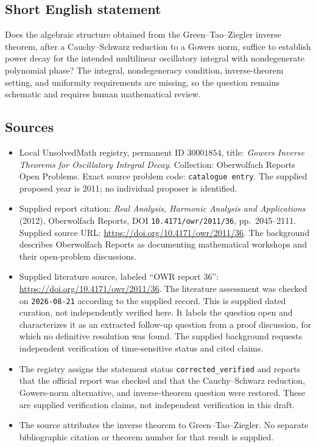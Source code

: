 \documentclass[11pt]{article}
\begin{document}
\subsection{Short English statement}
Does the algebraic structure obtained from the Green--Tao--Ziegler inverse theorem, after a Cauchy--Schwarz reduction to a Gowers norm, suffice to establish power decay for the intended multilinear oscillatory integral with nondegenerate polynomial phase? The integral, nondegeneracy condition, inverse-theorem setting, and uniformity requirements are missing, so the question remains schematic and requires human mathematical review.
\subsection{Sources}
\begin{itemize}
\item Local UnsolvedMath registry, permanent ID \(30001854\), title: \emph{Gowers Inverse Theorems for Oscillatory Integral Decay}. Collection: Oberwolfach Reports Open Problems. Exact source problem code: \texttt{catalogue entry}. The supplied proposed year is 2011; no individual proposer is identified.
\item Supplied report citation: \emph{Real Analysis, Harmonic Analysis and Applications} (2012), Oberwolfach Reports, DOI \texttt{10.4171/owr/2011/36}, pp.\ 2045--2111. Supplied source URL: \url{https://doi.org/10.4171/owr/2011/36}. The background describes Oberwolfach Reports as documenting mathematical workshops and their open-problem discussions.
\item Supplied literature source, labeled ``OWR report 36'': \url{https://doi.org/10.4171/owr/2011/36}. The literature assessment was checked on \texttt{2026-08-21} according to the supplied record. This is supplied dated curation, not independently verified here. It labels the question open and characterizes it as an extracted follow-up question from a proof discussion, for which no definitive resolution was found. The supplied background requests independent verification of time-sensitive status and cited claims.
\item The registry assigns the statement status \texttt{corrected\_verified} and reports that the official report was checked and that the Cauchy--Schwarz reduction, Gowers-norm alternative, and inverse-theorem question were restored. These are supplied verification claims, not independent verification in this draft.
\item The source attributes the inverse theorem to Green--Tao--Ziegler. No separate bibliographic citation or theorem number for that result is supplied.
\end{itemize}
\end{document}
